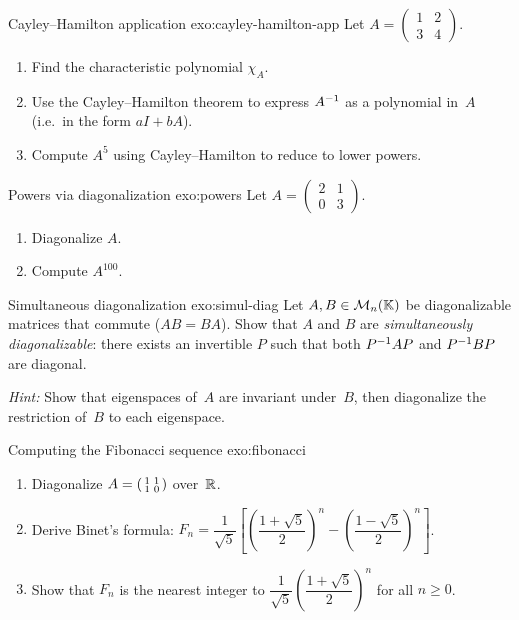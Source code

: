 \begin{exercise}{Cayley--Hamilton application \intermediate}%
{exo:cayley-hamilton-app}
Let $A = \begin{pmatrix} 1 & 2 \\ 3 & 4 \end{pmatrix}$.
\begin{enumerate}[label=(\alph*)]
  \item Find the characteristic polynomial $\chi_A$.
  \item Use the Cayley--Hamilton theorem to express ${A}^{-1}$ as a
    polynomial in~$A$ (i.e.\ in the form $aI + bA$).
  \item Compute $A^5$ using Cayley--Hamilton to reduce to lower
    powers.
\end{enumerate}
\end{exercise}

\begin{exercise}{Powers via diagonalization \intermediate}{exo:powers}
Let $A = \begin{pmatrix} 2 & 1 \\ 0 & 3 \end{pmatrix}$.
\begin{enumerate}[label=(\alph*)]
  \item Diagonalize $A$.
  \item Compute $A^{100}$.
\end{enumerate}
\end{exercise}

\begin{exercise}{Simultaneous diagonalization \challenging}%
{exo:simul-diag}
Let $A,B\in\mathcal{M}_n({\mathbb{K}})$ be diagonalizable matrices that commute
($AB = BA$).  Show that $A$ and $B$ are \emph{simultaneously
diagonalizable}: there exists an invertible $P$ such that both
${P}^{-1}AP$ and ${P}^{-1}BP$ are diagonal.

\noindent\textit{Hint:} Show that eigenspaces of~$A$ are invariant
under~$B$, then diagonalize the restriction of~$B$ to each eigenspace.
\end{exercise}

\begin{exercise}{Computing the Fibonacci sequence \intermediate}%
{exo:fibonacci}
\begin{enumerate}[label=(\alph*)]
  \item Diagonalize $A = \begin{psmallmatrix} 1 & 1 \\ 1 & 0
    \end{psmallmatrix}$ over~${\mathbb{R}}$.
  \item Derive Binet's formula:
    $F_n = \dfrac{1}{\sqrt{5}}\!\left[\left(\dfrac{1+\sqrt{5}}{2}
    \right)^{\!n} - \left(\dfrac{1-\sqrt{5}}{2}\right)^{\!n}\right]$.
  \item Show that $F_n$ is the nearest integer to
    $\dfrac{1}{\sqrt{5}}\left(\dfrac{1+\sqrt{5}}{2}\right)^{\!n}$
    for all $n\geq 0$.
\end{enumerate}
\end{exercise}

